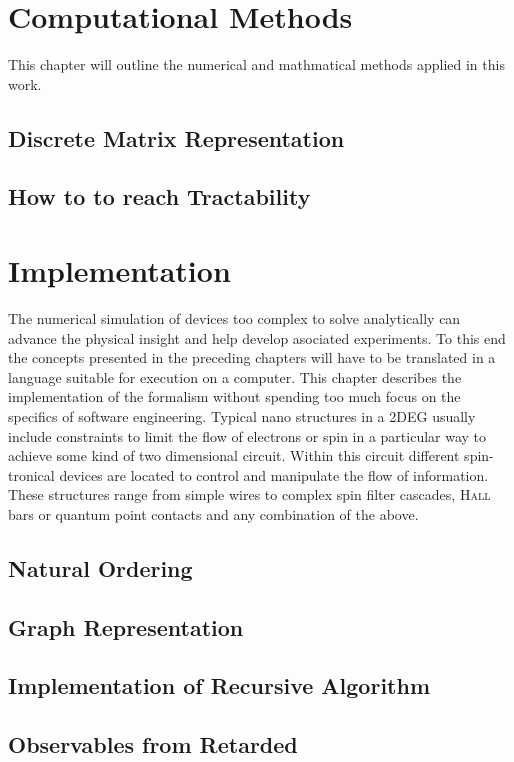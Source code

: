 \section{Computational Methods}
This chapter will outline the numerical and mathmatical methods applied in this work.
  \subsection{Discrete Matrix Representation}
  
  \subsection{How to to reach Tractability}
  
\section{Implementation}
The numerical simulation of devices too complex to solve analytically can advance the physical insight and help develop asociated experiments. To this end the concepts presented in the preceding chapters will have to be translated in a language suitable for execution on a computer. This chapter describes the implementation of the \gfnc{} formalism without spending too much focus on the specifics of software engineering.
Typical nano structures in a 2DEG usually include constraints to limit the flow of electrons or spin in a particular way to achieve some kind of two dimensional circuit. Within this circuit different spin-tronical devices are located to control and manipulate the flow of information. These structures range from simple wires to complex spin filter cascades, \textsc{Hall} bars or quantum point contacts and any combination of the above.
\subsection{Natural Ordering}
\subsection{Graph Representation}
\subsection{Implementation of Recursive \cgfnc{} Algorithm}
\label{sec:recursivegreenfncalgorithm}

\subsection{Observables from Retarded \cgfnc{}}
